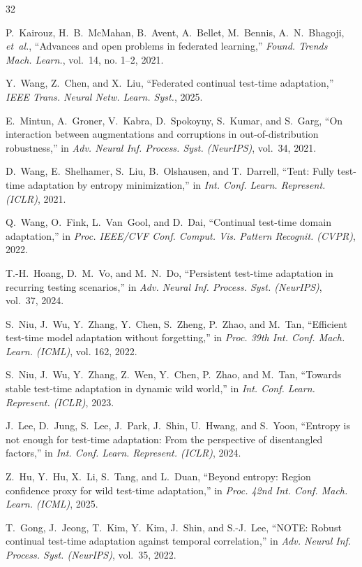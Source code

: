 \documentclass[journal]{IEEEtran}
\begin{document}
\begin{thebibliography}{32}

P.~Kairouz, H.~B.~McMahan, B.~Avent, A.~Bellet, M.~Bennis, A.~N.~Bhagoji, \emph{et~al.}, ``Advances and open problems in federated learning,'' \emph{Found. Trends Mach. Learn.}, vol.~14, no. 1--2, 2021.

Y.~Wang, Z.~Chen, and X.~Liu, ``Federated continual test-time adaptation,'' \emph{IEEE Trans. Neural Netw. Learn. Syst.}, 2025.

E.~Mintun, A.~Groner, V.~Kabra, D.~Spokoyny, S.~Kumar, and S.~Garg, ``On interaction between augmentations and corruptions in out-of-distribution robustness,'' in \emph{Adv. Neural Inf. Process. Syst. (NeurIPS)}, vol.~34, 2021.

D.~Wang, E.~Shelhamer, S.~Liu, B.~Olshausen, and T.~Darrell, ``Tent: Fully test-time adaptation by entropy minimization,'' in \emph{Int. Conf. Learn. Represent. (ICLR)}, 2021.

Q.~Wang, O.~Fink, L.~Van~Gool, and D.~Dai, ``Continual test-time domain adaptation,'' in \emph{Proc. IEEE/CVF Conf. Comput. Vis. Pattern Recognit. (CVPR)}, 2022.

T.-H.~Hoang, D.~M.~Vo, and M.~N.~Do, ``Persistent test-time adaptation in recurring testing scenarios,'' in \emph{Adv. Neural Inf. Process. Syst. (NeurIPS)}, vol.~37, 2024.

S.~Niu, J.~Wu, Y.~Zhang, Y.~Chen, S.~Zheng, P.~Zhao, and M.~Tan, ``Efficient test-time model adaptation without forgetting,'' in \emph{Proc. 39th Int. Conf. Mach. Learn. (ICML)}, vol. 162, 2022.

S.~Niu, J.~Wu, Y.~Zhang, Z.~Wen, Y.~Chen, P.~Zhao, and M.~Tan, ``Towards stable test-time adaptation in dynamic wild world,'' in \emph{Int. Conf. Learn. Represent. (ICLR)}, 2023.

J.~Lee, D.~Jung, S.~Lee, J.~Park, J.~Shin, U.~Hwang, and S.~Yoon, ``Entropy is not enough for test-time adaptation: From the perspective of disentangled factors,'' in \emph{Int. Conf. Learn. Represent. (ICLR)}, 2024.

Z.~Hu, Y.~Hu, X.~Li, S.~Tang, and L.~Duan, ``Beyond entropy: Region confidence proxy for wild test-time adaptation,'' in \emph{Proc. 42nd Int. Conf. Mach. Learn. (ICML)}, 2025.

T.~Gong, J.~Jeong, T.~Kim, Y.~Kim, J.~Shin, and S.-J.~Lee, ``NOTE: Robust continual test-time adaptation against temporal correlation,'' in \emph{Adv. Neural Inf. Process. Syst. (NeurIPS)}, vol.~35, 2022.


\end{thebibliography}
\end{document}
